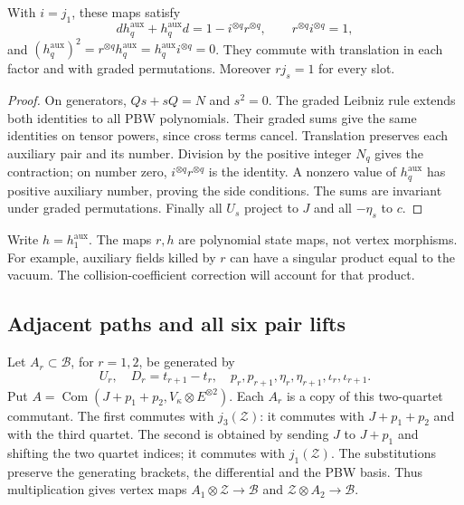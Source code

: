 \begin{lemma}\label{lem:vol2-supported-state-contraction}
With $i=j_1$, these maps satisfy
\[
 dh_q^{\mathrm{aux}}+h_q^{\mathrm{aux}}d
       =1-i^{\otimes q}r^{\otimes q},\qquad
 r^{\otimes q}i^{\otimes q}=1,
\]
and $(h_q^{\mathrm{aux}})^2=r^{\otimes q}h_q^{\mathrm{aux}}
=h_q^{\mathrm{aux}}i^{\otimes q}=0$.
They commute with translation in each factor and with graded
permutations. Moreover $rj_s=1$ for every slot.
\end{lemma}

\begin{proof}
On generators, $Qs+sQ=N$ and $s^2=0$. The graded Leibniz
rule extends both identities to all PBW polynomials. Their
graded sums give the same identities on tensor powers, since
cross terms cancel. Translation preserves each auxiliary pair
and its number. Division by the positive integer $N_q$ gives
the contraction; on number zero, $i^{\otimes q}r^{\otimes q}$
is the identity. A nonzero value of $h_q^{\mathrm{aux}}$ has
positive auxiliary number, proving the side conditions.
The sums are invariant under graded permutations. Finally all
$U_s$ project to $J$ and all $-\eta_s$ to $c$.
\end{proof}

Write $h=h_1^{\mathrm{aux}}$. The maps $r,h$ are polynomial
state maps, not vertex morphisms. For example, auxiliary
fields killed by $r$ can have a singular product equal to the
vacuum. The collision-coefficient correction will account for
that product.

\subsection{Adjacent paths and all six pair lifts}

Let $A_r\subset\mathcal B$, for $r=1,2$, be generated by
\[
 U_r,\quad D_r=t_{r+1}-t_r,\quad
 p_r,p_{r+1},\eta_r,\eta_{r+1},\iota_r,\iota_{r+1}.
\]
Put $A=\operatorname{Com}(J+p_1+p_2,V_\kappa\otimes E^{\otimes2})$.
Each $A_r$ is a copy of this two-quartet commutant. The first
commutes with $j_3(\mathcal Z)$: it commutes with
$J+p_1+p_2$ and with the third quartet. The second is obtained
by sending $J$ to $J+p_1$ and shifting the two quartet indices;
it commutes with $j_1(\mathcal Z)$. The substitutions preserve
the generating brackets, the differential and the PBW basis.
Thus multiplication gives vertex maps
$A_1\otimes\mathcal Z\to\mathcal B$ and
$\mathcal Z\otimes A_2\to\mathcal B$.

